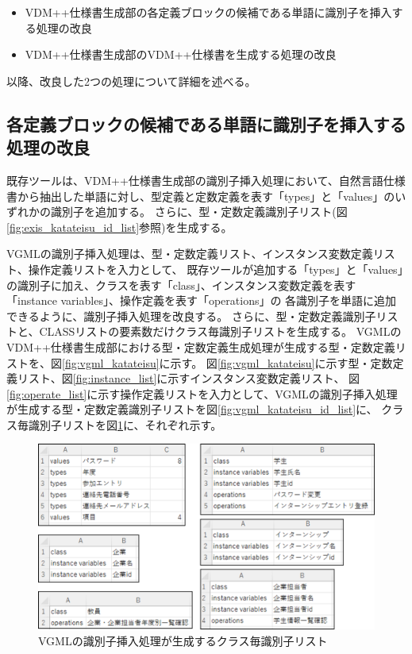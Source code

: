 \begin{itemize}
    \item VDM++仕様書生成部の各定義ブロックの候補である単語に識別子を挿入する処理の改良
    \item VDM++仕様書生成部のVDM++仕様書を生成する処理の改良
\end{itemize}

以降、改良した2つの処理について詳細を述べる。

\subsection{各定義ブロックの候補である単語に識別子を挿入する処理の改良}
既存ツールは、VDM++仕様書生成部の識別子挿入処理において、自然言語仕様書から抽出した単語に対し、型定義と定数定義を表す「types」と「values」のいずれかの識別子を追加する。
さらに、型・定数定義識別子リスト(図\ref{fig:exis_katateisu_id_list}参照)を生成する。

VGMLの識別子挿入処理は、型・定数定義リスト、インスタンス変数定義リスト、操作定義リストを入力として、
既存ツールが追加する「types」と「values」の識別子に加え、クラスを表す「class」、インスタンス変数定義を表す「instance variables」、操作定義を表す「operations」の
各識別子を単語に追加できるように、識別子挿入処理を改良する。
さらに、型・定数定義識別子リストと、CLASSリストの要素数だけクラス毎識別子リストを生成する。
VGMLのVDM++仕様書生成部における型・定数定義生成処理が生成する型・定数定義リストを、図\ref{fig:vgml_katateisu}に示す。
図\ref{fig:vgml_katateisu}に示す型・定数定義リスト、図\ref{fig:instance_list}に示すインスタンス変数定義リスト、
図\ref{fig:operate_list}に示す操作定義リストを入力として、VGMLの識別子挿入処理が生成する型・定数定義識別子リストを図\ref{fig:vgml_katateisu_id_list}に、
クラス毎識別子リストを図\ref{fig:vgml_sikibetushi_list}に、それぞれ示す。

\begin{figure}[t]
    \begin{center}
        \includegraphics[width=1.0\columnwidth]{image/vgml_sikibetushi_list.png}
        \caption{VGMLの識別子挿入処理が生成するクラス毎識別子リスト}
        \label{fig:vgml_sikibetushi_list}
    \end{center}
\end{figure}

